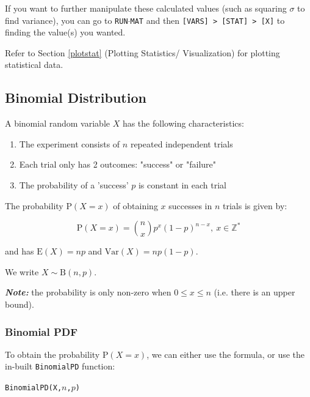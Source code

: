 \documentclass[a5paper,draft]{memoir}
\def\code#1{\texttt{#1}}
\def\note#1{\textbf{\textit{Note:}} #1}
\def\runmat{\code{RUN$\cdot$MAT} }
\newcommand{\addtoindex}[1]{#1\index{#1}}
\begin{document}
If you want to further manipulate these calculated values (such as squaring $\sigma$ to find variance), you can go to \runmat and then \code{[VARS] > [STAT] > [X]} to finding the value(s) you wanted.

Refer to Section \ref{plotstat} (Plotting Statistics/ Visualization) for plotting statistical data.

\subsection{Binomial Distribution} \label{binom}
A binomial random variable $X$ has the following characteristics:
\begin{enumerate}
	\item The experiment consists of $n$ repeated independent trials
	\item Each trial only has 2 outcomes: "success" or "failure"
	\item The probability of a 'success' $p$ is constant in each trial
\end{enumerate}

The probability $\textrm{P}(X = x)$ of obtaining $x$ successes in $n$ trials is given by:

\begin{equation}
	\mathrm{P}(X=x) = {n \choose x} p^x(1-p)^{n-x},~x \in \mathbb{Z}^*
\end{equation}

and has $\mathrm{E}(X) = np$ and $\mathrm{Var}(X)=np(1-p)$.

We write $X \sim \mathrm{B}(n, p)$.

\note{the probability is only non-zero when $0 \leq x \leq n$ (i.e. there is an upper bound).}

\subsubsection{Binomial PDF}

To obtain the probability $\textrm{P}(X = x)$, we can either use the formula, or use the in-built \code{\addtoindex{BinomialPD}} function:
\begin{center}
	\code{BinomialPD(X,$n$,$p$)}
\end{center}
\end{document}

